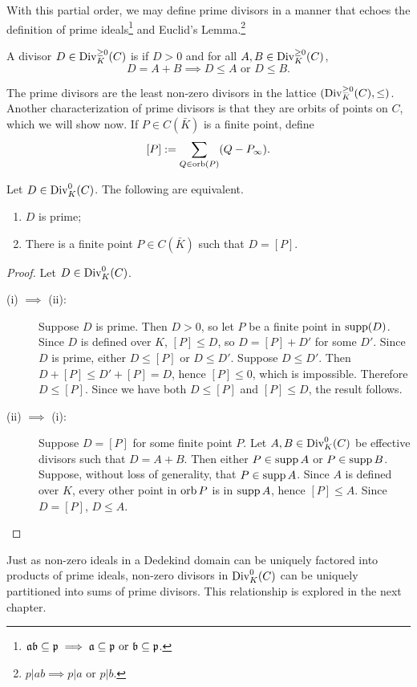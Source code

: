 With this partial order, we may define prime divisors in a manner that echoes
the definition of prime ideals\footnote{$\frak{ab} \subseteq \frak p \implies \frak a \subseteq \frak p \text{ or } \frak b \subseteq \frak p$.}
and Euclid's Lemma.\!\footnote{$p | ab \implies p | a \text{ or } p | b$.}
\begin{definition}
  A divisor $D \in \operatorname{Div}_K^{\geq 0}(C)$ is  if $D > 0$ and for all $A, B \in \operatorname{Div}_K^{\geq 0}(C)$,
  \[ D = A + B \implies D \leq A \text{ or } D \leq B. \]
\end{definition}
The prime divisors are the least non-zero divisors in the lattice $(\operatorname{Div}_K^{\geq 0}(C), \leq)$.
Another characterization of prime divisors is that they are orbits of points on $C$, which we will show now.
If $P \in C(\bar K)$ is a finite point, define
\[ [P] := \sum_{Q \in \operatorname{orb}(P)}(Q - P_\infty). \]
\begin{proposition}
  \label{prop_prime_divisors}
  Let $D \in \operatorname{Div}_K^0(C)$. The following are equivalent.
  \begin{enumerate}[label=(\roman*)]
    \item $D$ is prime;
    \item There is a finite point $P \in C(\bar K)$ such that $D = [P]$.
  \end{enumerate}
\end{proposition}
\begin{proof}
  Let $D \in \operatorname{Div}_K^0(C)$.
  \begin{description}
    \item[(i) $\implies$ (ii):]
      Suppose $D$ is prime.
      Then $D > 0$, so let $P$ be a finite point in $\operatorname{supp}(D)$.
      Since $D$ is defined over $K$, $[P] \leq D$, so $D = [P] + D'$ for some $D'$.
      Since $D$ is prime, either $D \leq [P]$ or $D \leq D'$.
      Suppose $D \leq D'$.
      Then $D + [P] \leq D' + [P] = D$, hence $[P] \leq 0$, which is impossible.
      Therefore $D \leq [P]$.
      Since we have both $D \leq [P]$ and $[P] \leq D$, the result follows.
      
    \item[(ii) $\implies$ (i):]
      Suppose $D = [P]$ for some finite point $P$.
      Let $A, B \in \operatorname{Div}_K^0(C)$ be effective divisors such that $D = A + B$.
      Then either $P \in \operatorname{supp} A$ or $P \in \operatorname{supp} B$.
      Suppose, without loss of generality, that $P \in \operatorname{supp} A$.
      Since $A$ is defined over $K$, every other point in $\operatorname{orb} P$ is in $\operatorname{supp} A$, hence $[P] \leq A$.
      Since $D = [P]$, $D \leq A$.
  \end{description}
\end{proof}

Just as non-zero ideals in a Dedekind domain can be uniquely factored into products of prime ideals,
non-zero divisors in $\operatorname{Div}_K^0(C)$ can be uniquely partitioned into sums of prime divisors.
This relationship is explored in the next chapter.
